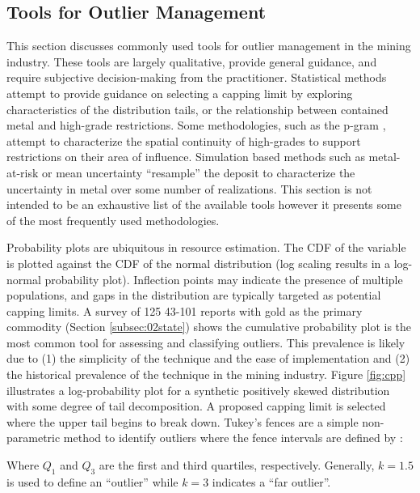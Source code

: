 \subsection{Tools for Outlier Management}
\label{subsec:02tools}

This section discusses commonly used tools for outlier management in the mining industry. These tools are largely qualitative, provide general guidance, and require subjective decision-making from the practitioner. Statistical methods attempt to provide guidance on selecting a capping limit by exploring characteristics of the distribution tails, or the relationship between contained metal and high-grade restrictions. Some methodologies, such as the p-gram \citep{nowak2019optimal}, attempt to characterize the spatial continuity of high-grades to support restrictions on their area of influence. Simulation based methods such as metal-at-risk \citep{parker2006} or mean uncertainty \citep{nowak2013suggestions} ``resample'' the deposit to characterize the uncertainty in metal over some number of realizations. This section is not intended to be an exhaustive list of the available tools however it presents some of the most frequently used methodologies.

Probability plots are ubiquitous in resource estimation. The \gls{CDF} of the variable is plotted against the \gls{CDF} of the normal distribution (log scaling results in a log-normal probability plot). Inflection points may indicate the presence of multiple populations, and gaps in the distribution are typically targeted as potential capping limits. A survey of 125 43-101 reports with gold as the primary commodity (Section \ref{subsec:02state}) shows the cumulative probability plot is the most common tool for assessing and classifying outliers. This prevalence is likely due to (1) the simplicity of the technique and the ease of implementation and (2) the historical prevalence of the technique in the mining industry. Figure \ref{fig:cpp} illustrates a log-probability plot for a synthetic positively skewed distribution with some degree of tail decomposition. A proposed capping limit is selected where the upper tail begins to break down. Tukey's fences are a simple non-parametric method to identify outliers where the fence intervals are defined by \citep{tukey1977exploratory}:
\begin{equation}
    [Q_{1}-k(Q_{3}-Q_{1})), Q_{3}+k(Q_{3}-Q_{1}))]
    \label{eq:tukey}
\end{equation}

Where $Q_{1}$ and $Q_{3}$ are the first and third quartiles, respectively. Generally, $k=1.5$ is used to define an ``outlier'' while $k=3$ indicates a ``far outlier''.

